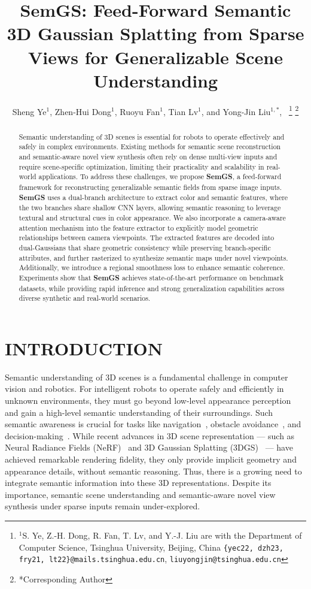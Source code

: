 \documentclass[letterpaper, 10 pt, conference]{ieeeconf}  %
\title{\LARGE \bf
SemGS: Feed-Forward Semantic 3D Gaussian Splatting from Sparse Views for Generalizable Scene Understanding
}
\author{Sheng Ye$^{1}$, Zhen-Hui Dong$^{1}$, Ruoyu Fan$^{1}$, Tian Lv$^{1}$, and Yong-Jin Liu$^{1,*}$,~\IEEEmembership{Senior Member,~IEEE}%
\thanks{$^{1}$S. Ye, Z.-H. Dong, R. Fan, T. Lv, and Y.-J. Liu are with the Department of Computer Science, Tsinghua University, Beijing, China {\tt\small \{yec22, dzh23, fry21, lt22\}@mails.tsinghua.edu.cn}, \tt\small liuyongjin@tsinghua.edu.cn}%
\thanks{*Corresponding Author}%
}
\begin{document}
\maketitle
\thispagestyle{empty}
\pagestyle{empty}


\begin{abstract}
Semantic understanding of 3D scenes is essential for robots to operate effectively and safely in complex environments. Existing methods for semantic scene reconstruction and semantic-aware novel view synthesis often rely on dense multi-view inputs and require scene-specific optimization, limiting their practicality and scalability in real-world applications. To address these challenges, we propose \textbf{SemGS}, a feed-forward framework for reconstructing generalizable semantic fields from sparse image inputs. \textbf{SemGS} uses a dual-branch architecture to extract color and semantic features, where the two branches share shallow CNN layers, allowing semantic reasoning to leverage textural and structural cues in color appearance. We also incorporate a camera-aware attention mechanism into the feature extractor to explicitly model geometric relationships between camera viewpoints. The extracted features are decoded into dual-Gaussians that share geometric consistency while preserving branch-specific attributes, and further rasterized to synthesize semantic maps under novel viewpoints. Additionally, we introduce a regional smoothness loss to enhance semantic coherence. Experiments show that \textbf{SemGS} achieves state-of-the-art performance on benchmark datasets, while providing rapid inference and strong generalization capabilities across diverse synthetic and real-world scenarios.
\end{abstract}

\section{INTRODUCTION}
Semantic understanding of 3D scenes is a fundamental challenge in computer vision and robotics. For intelligent robots to operate safely and efficiently in unknown environments, they must go beyond low-level appearance perception and gain a high-level semantic understanding of their surroundings. Such semantic awareness is crucial for tasks like navigation~\cite{navigation, context-navigation}, obstacle avoidance~\cite{obstacle}, and decision-making~\cite{decision}. While recent advances in 3D scene representation — such as Neural Radiance Fields (NeRF)~\cite{nerf} and 3D Gaussian Splatting (3DGS)~\cite{3dgs} — have achieved remarkable rendering fidelity, they only provide implicit geometry and appearance details, without semantic reasoning.
Thus, there is a growing need to integrate semantic information into these 3D representations. Despite its importance, semantic scene understanding and semantic-aware novel view synthesis under sparse inputs remain under-explored.
\end{document}
